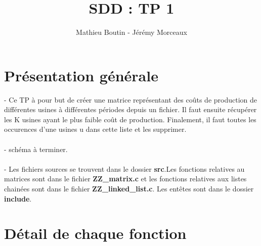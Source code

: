 \documentclass[a4paper]{article}
\title{SDD : TP 1}
\author{Mathieu Boutin - Jérémy Morceaux}
\begin{document}
\maketitle
\section{Présentation générale}
- Ce TP à pour but de créer une matrice représentant des coûts de production de différentes usines à différentes périodes depuis un fichier. Il faut ensuite récupérer les K usines ayant le plus faible coût de production. Finalement, il faut toutes les occurences d'une usines u dans cette liste et les supprimer.
\\
\\
- schéma  à terminer.
\\
\\
- Les fichiers sources se trouvent dans le dossier \textbf{src}.Les fonctions relatives au matrices sont dans le fichier \textbf{ZZ\_matrix.c} et les fonctions relatives aux listes chainées sont dans le fichier \textbf{ZZ\_linked\_list.c}. Les entêtes sont dans le dossier \textbf{include}.

\section{Détail de chaque fonction}
\end{document}
